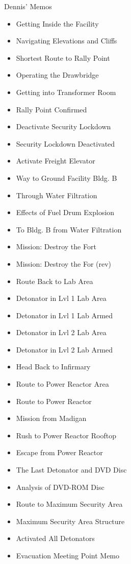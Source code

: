 \begin{memo}{Dennis' Memos}
    \begin{itemize}
        \item Getting Inside the Facility
        \item Navigating Elevations and Cliffs
        \item Shortest Route to Rally Point
        \item Operating the Drawbridge
        \item Getting into Transformer Room
        \item Rally Point Confirmed
        \item Deactivate Security Lockdown
        \item Security Lockdown Deactivated
        \item Activate Freight Elevator
        \item Way to Ground Facility Bldg. B
        \item Through Water Filtration
        \item Effects of Fuel Drum Explosion
        \item To Bldg. B from Water Filtration
        \item Mission: Destroy the Fort
        \item Mission: Destroy the For (rev)
        \item Route Back to Lab Area
        \item Detonator in Lvl 1 Lab Area
        \item Detonator in Lvl 1 Lab Armed
        \item Detonator in Lvl 2 Lab Area
        \item Detonator in Lvl 2 Lab Armed
        \item Head Back to Infirmary
        \item Route to Power Reactor Area
        \item Route to Power Reactor
        \item Mission from Madigan
        \item Rush to Power Reactor Rooftop
        \item Escape from Power Reactor
        \item The Last Detonator and DVD Disc
        \item Analysis of DVD-ROM Disc
        \item Route to Maximum Security Area
        \item Maximum Security Area Structure
        \item Activated All Detonators
        \item Evacuation Meeting Point Memo
    \end{itemize}
\end{memo}
